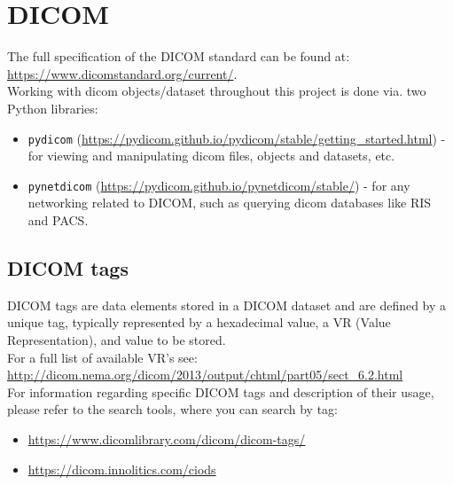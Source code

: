 \documentclass{article}
\begin{document}
\section{DICOM}
The full specification of the DICOM standard can be found at:\\ \url{https://www.dicomstandard.org/current/}. \\

Working with dicom objects/dataset throughout this project is done via. two Python libraries:
\begin{itemize}
	\item \texttt{pydicom} (\url{https://pydicom.github.io/pydicom/stable/getting_started.html}) - for viewing and manipulating dicom files, objects and datasets, etc.
	\item \texttt{pynetdicom} (\url{https://pydicom.github.io/pynetdicom/stable/}) - for any networking related to DICOM, such as querying dicom databases like RIS and PACS.
\end{itemize}

\subsection{DICOM tags}
DICOM tags are data elements stored in a DICOM dataset and are defined by a unique tag, typically represented by a hexadecimal value, a VR (Value Representation), and value to be stored. \\

For a full list of available VR's see: \url{http://dicom.nema.org/dicom/2013/output/chtml/part05/sect_6.2.html} \\

For information regarding specific DICOM tags and description of their usage, please refer to the search tools, where you can search by tag:
\begin{itemize}
	\item \url{https://www.dicomlibrary.com/dicom/dicom-tags/}
	\item \url{https://dicom.innolitics.com/ciods}
\end{itemize}
\end{document}
